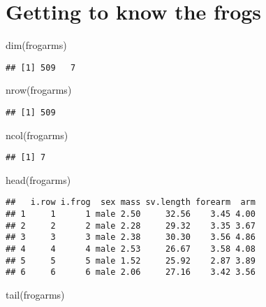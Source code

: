 \documentclass[
]{book}
\newenvironment{Shaded}{\begin{snugshade}}{\end{snugshade}}
\newcommand{\FunctionTok}[1]{\textcolor[rgb]{0.00,0.00,0.00}{#1}}
\newcommand{\NormalTok}[1]{#1}
\begin{document}
\hypertarget{getting-to-know-the-frogs}{%
\section{Getting to know the frogs}\label{getting-to-know-the-frogs}}

\begin{Shaded}
\begin{Highlighting}[]
\FunctionTok{dim}\NormalTok{(frogarms)}
\end{Highlighting}
\end{Shaded}

\begin{verbatim}
## [1] 509   7
\end{verbatim}

\begin{Shaded}
\begin{Highlighting}[]
\FunctionTok{nrow}\NormalTok{(frogarms)}
\end{Highlighting}
\end{Shaded}

\begin{verbatim}
## [1] 509
\end{verbatim}

\begin{Shaded}
\begin{Highlighting}[]
\FunctionTok{ncol}\NormalTok{(frogarms)}
\end{Highlighting}
\end{Shaded}

\begin{verbatim}
## [1] 7
\end{verbatim}

\begin{Shaded}
\begin{Highlighting}[]
\FunctionTok{head}\NormalTok{(frogarms)}
\end{Highlighting}
\end{Shaded}

\begin{verbatim}
##   i.row i.frog  sex mass sv.length forearm  arm
## 1     1      1 male 2.50     32.56    3.45 4.00
## 2     2      2 male 2.28     29.32    3.35 3.67
## 3     3      3 male 2.38     30.30    3.56 4.86
## 4     4      4 male 2.53     26.67    3.58 4.08
## 5     5      5 male 1.52     25.92    2.87 3.89
## 6     6      6 male 2.06     27.16    3.42 3.56
\end{verbatim}

\begin{Shaded}
\begin{Highlighting}[]
\FunctionTok{tail}\NormalTok{(frogarms)}
\end{Highlighting}
\end{Shaded}
\end{document}
